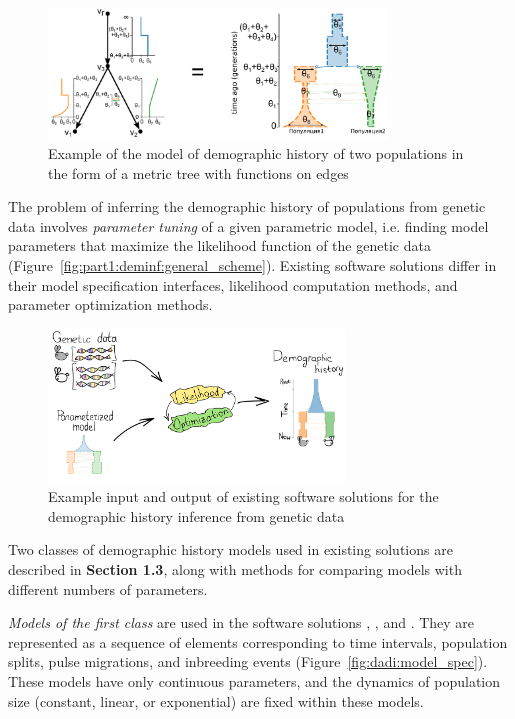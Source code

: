 \begin{figure}[ht]
    \centering
    \includegraphics[width=0.8\textwidth]{images/part1/2d_model_metric_tree_2.pdf}
    \caption{Example of the model of demographic history of two populations in the form of a metric tree with functions on edges}
\end{figure}

The problem of inferring the demographic history of populations from genetic data involves \textit{parameter tuning} of a given parametric model, i.e. finding model parameters that maximize the likelihood function of the genetic data (Figure~\ref{fig:part1:deminf:general_scheme}).
Existing software solutions differ in their model specification interfaces, likelihood computation methods, and parameter optimization methods.

\begin{figure}[ht]
\includegraphics[width=0.7\textwidth]{images/part1/dem_history/general_scheme_en.pdf}
\caption{Example input and output of existing software solutions for the demographic history inference from genetic data}
\end{figure}

Two classes of demographic history models used in existing solutions are described in \textbf{Section 1.3}, along with methods for comparing models with different numbers of parameters.

\textit{Models of the first class} are used in the software solutions \dadi, \moments, and \momentsLD.
They are represented as a sequence of elements corresponding to time intervals, population splits, pulse migrations, and inbreeding events (Figure~\ref{fig:dadi:model_spec}).
These models have only continuous parameters, and the dynamics of population size (constant, linear, or exponential) are fixed within these models.

